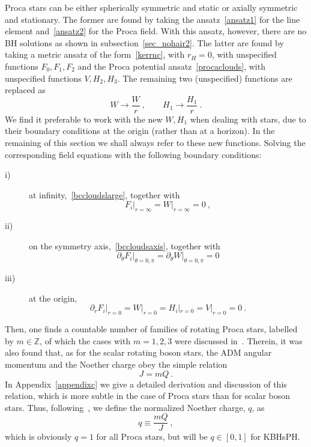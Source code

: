 Proca stars can be either spherically symmetric and static or axially symmetric and stationary. The former are found by taking the ansatz~\eqref{ansatz1} for the line element and~\eqref{ansatz2} for the Proca field. With this ansatz, however, there are no BH solutions as shown in subsection~\ref{sec_nohair2}. The latter are found by taking a metric ansatz of the form~\eqref{kerrnc}, with $r_H=0$, with unspecified functions $F_0,F_1,F_2$ and the Proca potential ansatz~\eqref{procaclouds}, with unspecified functions $V,H_2,H_3$.  The remaining two (unspecified) functions are replaced as
\begin{equation}
W\rightarrow \frac{{W}}{r} \ , \qquad H_1\rightarrow \frac{{H_1}}{r} \ . 
\label{ww}
\end{equation}
We find it preferable to work with the new ${W},{H_1}$ when dealing with stars, due to their boundary conditions at the origin (rather than at a horizon). In the remaining of this section we shall always refer to these new functions. Solving the corresponding field equations with the following boundary conditions:
\begin{description}
\item[i)] at infinity,~\eqref{bccloudslarge}, together with
\begin{equation}
F_i\big|_{r=\infty}={W}\big|_{r=\infty}=0 \ , 
\label{bcstarslarge}
\end{equation}
\item[ii)] on the symmetry axis,~\eqref{bccloudsaxis}, together with 
\begin{equation}
 \partial_\theta F_i\big|_{\theta=0,\pi}=\partial_\theta {W}\big|_{\theta=0,\pi}=0
 \label{bcstarsaxis}
 \end{equation}
 \item[iii)] at the origin, 
 \begin{equation}
 \partial_r F_i\big|_{r=0}={W}\big|_{r=0}=H_i|_{r=0}=V|_{r=0}=0 \ .
 \end{equation}
\end{description} 
 Then, one finds a countable number of families of rotating Proca stars, labelled by $m\in \mathbb{Z}$, of which the cases with $m=1,2,3$ were discussed in~\cite{Brito:2015pxa}.  Therein, it was also found that, as for the scalar rotating boson stars, the ADM angular momentum and the Noether charge obey the simple relation 
 \begin{equation}
 J=mQ \ .
\label{amnc}
 \end{equation}
%
In Appendix~\ref{appendixc} we give a detailed derivation and discussion of this relation, which is more subtle in the case of Proca stars than for scalar boson stars.  Thus, following~\cite{Herdeiro:2014goa}, we define the normalized Noether charge, $q$, as 
 \begin{equation}
 q\equiv \frac{mQ}{J} \ ,
 \label{jq}
 \end{equation}
 which is obviously $q=1$ for all Proca stars, but will be $q\in [0,1]$ for KBHsPH.
 
